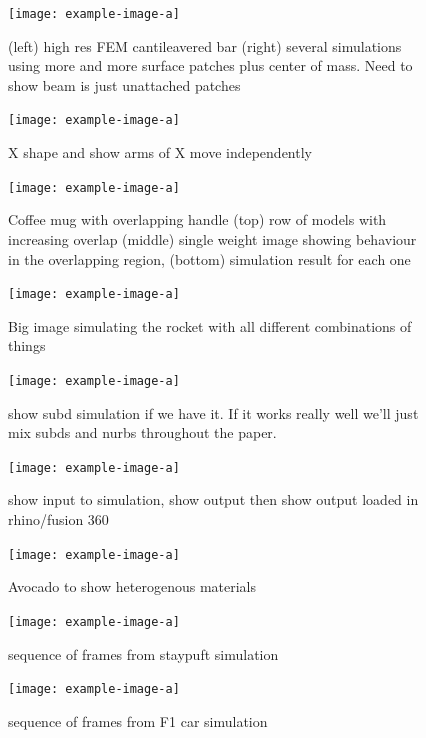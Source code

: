 \begin{figure}
  \texttt{[image: example-image-a]}
  \caption{(left) high res FEM cantileavered bar (right) several simulations using more and more surface patches plus center of mass. Need to show beam is just  unattached patches}
  \label{fig:convergence}
\end{figure}

\begin{figure}
  \texttt{[image: example-image-a]}
  \caption{X shape and show arms of X move independently}
  \label{fig:independence}
\end{figure}

\begin{figure}
  \texttt{[image: example-image-a]}
  \caption{Coffee mug with overlapping handle (top) row of models with increasing overlap (middle) single weight image showing behaviour in the overlapping region, (bottom) simulation result for each one}
  \label{fig:badmodels}
\end{figure}

\begin{figure}
  \texttt{[image: example-image-a]}
  \caption{Big image simulating the rocket with all different combinations of things}
  \label{fig:materials}
\end{figure}

\begin{figure}
  \texttt{[image: example-image-a]}
  \caption{show subd simulation if we have it. If it works really well we'll just mix subds and nurbs throughout the paper. }
  \label{fig:subd}
\end{figure}

\begin{figure}
  \texttt{[image: example-image-a]}
  \caption{show input to simulation, show output then show output loaded in rhino/fusion 360 }
  \label{fig:edit}
\end{figure}


\begin{figure}
  \texttt{[image: example-image-a]}
  \caption{Avocado to show heterogenous materials}
  \label{fig:avocado}
\end{figure}

\begin{figure}[htp]
  \texttt{[image: example-image-a]}
  \caption{sequence of frames from staypuft simulation}
  \label{fig:staypuft}
\end{figure}

\begin{figure}[htp]
  \texttt{[image: example-image-a]}
  \caption{sequence of frames from F1 car simulation}
  \label{fig:f1}
\end{figure}

